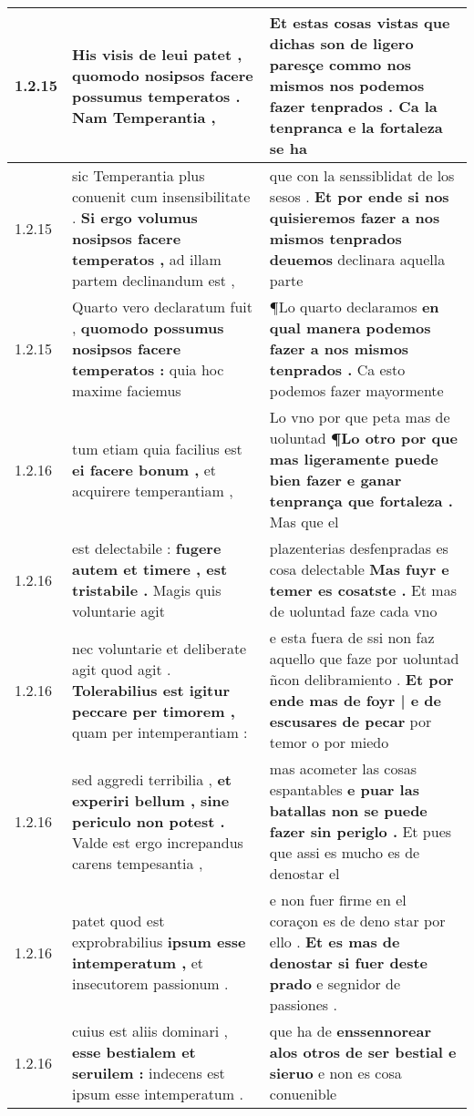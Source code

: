 \begin{tabular}{|p{1cm}|p{6.5cm}|p{6.5cm}|}
1.2.15 & His visis de leui patet , \textbf{ quomodo nosipsos facere possumus temperatos . } Nam Temperantia , & Et estas cosas vistas \textbf{ que dichas son de ligero paresçe commo nos mismos nos podemos fazer tenprados . } Ca la tenpranca e la fortaleza se ha \\\hline
1.2.15 & sic Temperantia plus conuenit cum insensibilitate . \textbf{ Si ergo volumus nosipsos facere temperatos , } ad illam partem declinandum est , & que con la senssiblidat de los sesos . \textbf{ Et por ende si nos quisieremos fazer a nos mismos tenprados deuemos } declinara aquella parte \\\hline
1.2.15 & Quarto vero declaratum fuit , \textbf{ quomodo possumus nosipsos facere temperatos : } quia hoc maxime faciemus & ¶Lo quarto declaramos \textbf{ en qual manera podemos fazer a nos mismos tenprados . } Ca esto podemos fazer mayormente \\\hline
1.2.16 & tum etiam quia facilius est \textbf{ ei facere bonum , } et acquirere temperantiam , & Lo vno por que peta mas de uoluntad \textbf{ ¶Lo otro por que mas ligeramente puede bien fazer e ganar tenprança que fortaleza . } Mas que el \\\hline
1.2.16 & est delectabile : \textbf{ fugere autem et timere , est tristabile . } Magis quis voluntarie agit & plazenterias desfenpradas es cosa delectable \textbf{ Mas fuyr e temer es cosatste . } Et mas de uoluntad faze cada vno \\\hline
1.2.16 & nec voluntarie et deliberate agit quod agit . \textbf{ Tolerabilius est igitur peccare per timorem , } quam per intemperantiam : & e esta fuera de ssi non faz aquello que faze por uoluntad ñcon delibramiento . \textbf{ Et por ende mas de foyr | e de escusares de pecar } por temor o por miedo \\\hline
1.2.16 & sed aggredi terribilia , \textbf{ et experiri bellum , sine periculo non potest . } Valde est ergo increpandus carens tempesantia , & mas acometer las cosas espantables \textbf{ e puar las batallas non se puede fazer sin periglo . } Et pues que assi es mucho es de denostar el \\\hline
1.2.16 & patet quod est exprobrabilius \textbf{ ipsum esse intemperatum , } et insecutorem passionum . & e non fuer firme en el coraçon es de deno star por ello . \textbf{ Et es mas de denostar si fuer deste prado } e segnidor de passiones . \\\hline
1.2.16 & cuius est aliis dominari , \textbf{ esse bestialem et seruilem : } indecens est ipsum esse intemperatum . & que ha de \textbf{ enssennorear alos otros de ser bestial e sieruo } e non es cosa conuenible \\\hline

\end{tabular}
